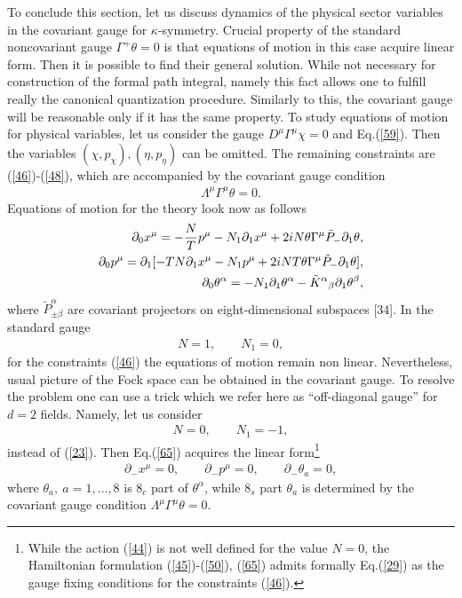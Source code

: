 \documentclass[a4paper]{article}
\begin{document}
To conclude this section, let us discuss dynamics of the physical sector 
variables in the covariant gauge for $\kappa$-symmetry. 
Crucial property of the standard
noncovariant gauge $\Gamma^+\theta=0$ is that equations of motion in
this case acquire linear form. Then it is possible to find their
general solution. While not necessary for construction of the formal
path integral, namely this fact allows one to fulfill really the
canonical quantization procedure. Similarly to this, the covariant
gauge will be reasonable only if it has the same property.
To study equations of motion for physical variables, let us consider
the gauge $D^\mu\Gamma^\mu\chi=0$ and Eq.(\ref{59}). Then the variables
$(\chi, p_\chi), (\eta, p_\eta)$ can be omitted. 
The remaining constraints are (\ref{46})-(\ref{48}), which are 
accompanied by the covariant gauge condition 
\begin{eqnarray}\label{61}
\Lambda^\mu\Gamma^\mu\theta=0.
\end{eqnarray}
Equations of motion for the theory look now as follows
\begin{eqnarray}\label{65}
\partial_0x^\mu=-\frac{N}{T}p^\mu-N_1\partial_1x^\mu+
2iN\theta\Gamma^\mu\tilde P_-\partial_1\theta, \cr
\partial_0p^\mu=\partial_1[-TN\partial_1x^\mu-N_1p^\mu+
2iNT\theta\Gamma^\mu\tilde P_-\partial_1\theta], \cr
\partial_0\theta^\alpha=-N_1\partial_1\theta^\alpha-
\tilde K^\alpha{}_\beta\partial_1\theta^\beta,
\end{eqnarray}
where $\tilde P^\alpha_{\pm\beta}$ are covariant projectors on 
eight-dimensional subspaces [34]. In the standard gauge 
\begin{eqnarray}\label{23}
N=1, \qquad N_1=0,
\end{eqnarray}
for the constraints (\ref{46}) the equations of motion 
remain non linear. 
Nevertheless, usual picture of the Fock space can be obtained in the
covariant gauge. To resolve the problem one can use a trick which
we refer here as ``off-diagonal gauge'' for $d=2$ fields. 
Namely, let us consider
\begin{eqnarray}\label{29}
N=0, \qquad N_1=-1,
\end{eqnarray}
instead of (\ref{23}). Then Eq.(\ref{65}) acquires the linear 
form\footnote{While the action
(\ref{44}) is not well defined for the value $N=0$, the Hamiltonian
formulation (\ref{45})-(\ref{50}), (\ref{65}) 
admits formally Eq.(\ref{29}) as
the gauge fixing conditions for the constraints (\ref{46}).}
\begin{eqnarray}\label{66}
\partial_-x^\mu=0, \qquad \partial_-p^\mu=0, \qquad 
\partial_-\theta_a=0,
\end{eqnarray}
where $\theta_a, ~ a=1, \ldots ,8$ is $8_c$ part of $\theta^\alpha$,
while $8_s$ part $\theta_{\dot a}$ is determined by the covariant gauge
condition $\Lambda^\mu\Gamma^\mu\theta=0$. 
\end{document}
